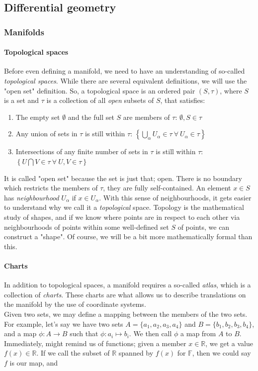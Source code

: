 \documentclass[10pt]{report}
\begin{document}
	\newpage
	\begin{appendices}
	\chapter{Differential geometry}
	\subsection{Manifolds}
	\subsubsection{Topological spaces}
	Before even defining a manifold, we need to have an understanding of so-called \emph{topological spaces}. While there are several equivalent definitions, we will use the "open set" definition. So, a topological space is an ordered pair $(S,\tau)$, where $S$ is a set and $\tau$ is a collection of all \emph{open} subsets of $S$, that satisfies:
	
	\begin{enumerate}
		\item The empty set $\emptyset$ and the full set $S$ are members of $\tau$: $\emptyset, S\in \tau$
		\item Any union of sets in $\tau$ is still within $\tau$: $\left\{\bigcup_\alpha U_\alpha\in\tau\: \forall \:U_\alpha\in\tau\right\}$ 
		\item Intersections of any finite number of sets in $\tau$ is still within $\tau$: $\left\{U\bigcap V\in\tau\: \forall \:U,V\in\tau\right\}$ 
	\end{enumerate}
	
	It is called "open set" because the set is just that; open. There is no boundary which restricts the members of $\tau$, they are fully self-contained. An element $x\in S$ has \emph{neighbourhood} $U_\alpha$ if $x\in U_\alpha$. With this sense of neighbourhoods, it gets easier to understand why we call it a \emph{topological} space. Topology is the mathematical study of shapes, and if we know where points are in respect to each other via neighbourhoods of points within some well-defined set $S$ of points, we can construct a "shape". Of course, we will be a bit more mathematically formal than this.
	
	\subsubsection{Charts}
	In addition to topological spaces, a manifold requires a so-called \emph{atlas}, which is a collection of \emph{charts}. These charts are what allows us to describe translations on the manifold by the use of coordinate systems.\\
	Given two sets, we may define a mapping between the members of the two sets. For example, let's say we have two sets $A = \{a_1,a_2,a_3,a_4\}$ and $B = \{b_1,b_2,b_3,b_4\}$, and a map $\phi: A \to B$ such that $\phi: a_i\mapsto b_i$. We then call $\phi$ a map from $A$ to $B$. Immediately, might remind us of functions; given a member $x \in \mathbb{R}$, we get a value $f(x) \in \mathbb{R}$. If we call the subset of $\mathbb{R}$ spanned by $f(x)$ for $\mathbb{F}$, then we could say $f$ is our map, and
	

\end{appendices}
\end{document}
